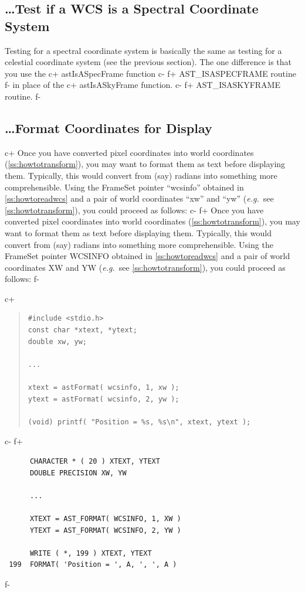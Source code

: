\documentclass[twoside,11pt]{article}
\newcommand{\secref}[1]{\S\ref{#1}}
\renewcommand{\secref}[1]{\ref{#1}}
\begin{document}
\subsection{\label{ss:howtotestforspectral}\ldots Test if a WCS is a Spectral Coordinate System}
Testing for a spectral coordinate system is basically the same as testing
for a celestial coordinate system (see the previous section). The one
difference is that you use the 
c+
astIsASpecFrame function
c-
f+
AST\_ISASPECFRAME routine
f-
in place of the 
c+
astIsASkyFrame function.
c-
f+
AST\_ISASKYFRAME routine.
f-

\subsection{\label{ss:howtoformatcoordinates}\ldots Format Coordinates for Display}

c+
Once you have converted pixel coordinates into world coordinates
(\secref{ss:howtotransform}), you may want to format them as text
before displaying them. Typically, this would convert from (say)
radians into something more comprehensible. Using the FrameSet pointer
``wcsinfo'' obtained in \secref{ss:howtoreadwcs} and a pair of world
coordinates ``xw'' and ``yw'' ({\em{e.g.}}\ see
\secref{ss:howtotransform}), you could proceed as follows:
c-
f+
Once you have converted pixel coordinates into world coordinates
(\secref{ss:howtotransform}), you may want to format them as text
before displaying them. Typically, this would convert from (say)
radians into something more comprehensible. Using the FrameSet pointer
WCSINFO obtained in \secref{ss:howtoreadwcs} and a pair of world
coordinates XW and YW ({\em{e.g.}}\ see \secref{ss:howtotransform}),
you could proceed as follows:
f-

c+
\begin{quote}
\small
\begin{verbatim}
#include <stdio.h>
const char *xtext, *ytext;
double xw, yw;

...

xtext = astFormat( wcsinfo, 1, xw );
ytext = astFormat( wcsinfo, 2, yw );

(void) printf( "Position = %s, %s\n", xtext, ytext );
\end{verbatim}
\normalsize
\end{quote}
c-
f+
\small
\begin{verbatim}
      CHARACTER * ( 20 ) XTEXT, YTEXT
      DOUBLE PRECISION XW, YW

      ...

      XTEXT = AST_FORMAT( WCSINFO, 1, XW )
      YTEXT = AST_FORMAT( WCSINFO, 2, YW )

      WRITE ( *, 199 ) XTEXT, YTEXT
 199  FORMAT( 'Position = ', A, ', ', A )
\end{verbatim}
\normalsize
f-
\end{document}
